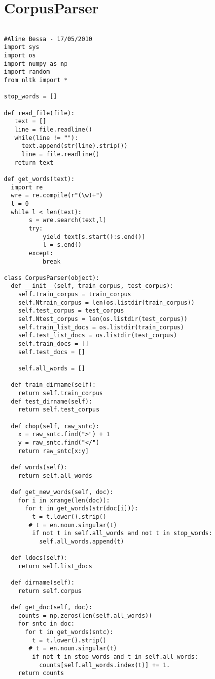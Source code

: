 \section{CorpusParser}

\begin{lstlisting}

#Aline Bessa - 17/05/2010
import sys
import os
import numpy as np
import random
from nltk import *

stop_words = [] 

def read_file(file):
   text = []
   line = file.readline()
   while(line != ""):
     text.append(str(line).strip())
     line = file.readline()
   return text

def get_words(text):
  import re
  wre = re.compile(r"(\w)+")
  l = 0
  while l < len(text):
       s = wre.search(text,l)
       try:
           yield text[s.start():s.end()]
           l = s.end()
       except:
           break

class CorpusParser(object):
  def __init__(self, train_corpus, test_corpus):
    self.train_corpus = train_corpus
    self.Ntrain_corpus = len(os.listdir(train_corpus))
    self.test_corpus = test_corpus
    self.Ntest_corpus = len(os.listdir(test_corpus))
    self.train_list_docs = os.listdir(train_corpus)
    self.test_list_docs = os.listdir(test_corpus)
    self.train_docs = []
    self.test_docs = []

    self.all_words = []

  def train_dirname(self):
    return self.train_corpus
  def test_dirname(self):
    return self.test_corpus

  def chop(self, raw_sntc):
    x = raw_sntc.find(">") + 1
    y = raw_sntc.find("</")
    return raw_sntc[x:y]

  def words(self):
    return self.all_words

  def get_new_words(self, doc):
    for i in xrange(len(doc)):
      for t in get_words(str(doc[i])):
        t = t.lower().strip()
       # t = en.noun.singular(t)
        if not t in self.all_words and not t in stop_words:
          self.all_words.append(t)

  def ldocs(self):
    return self.list_docs

  def dirname(self):
    return self.corpus

  def get_doc(self, doc):
    counts = np.zeros(len(self.all_words))
    for sntc in doc:
      for t in get_words(sntc):
        t = t.lower().strip()
       # t = en.noun.singular(t)
        if not t in stop_words and t in self.all_words:
          counts[self.all_words.index(t)] += 1.
    return counts


\end{lstlisting}
